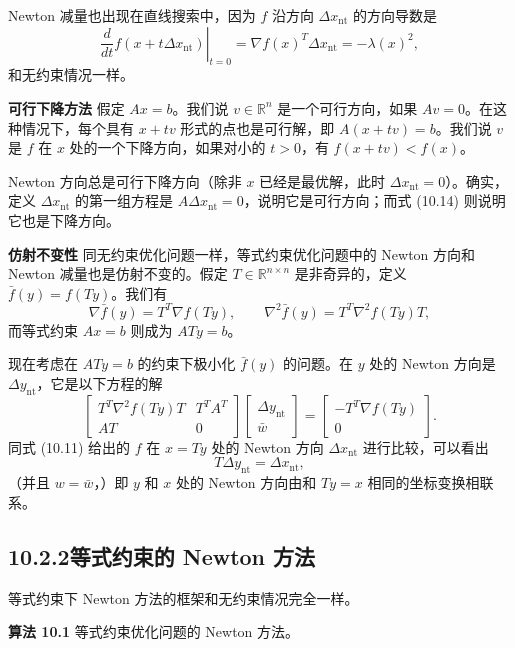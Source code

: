 \documentclass[UTF8, 12pt, fontset=fandol, oneside]{ctexart}
\begin{document}
Newton 减量也出现在直线搜索中，因为 $f$ 沿方向 $\Delta x_{\mathrm{nt}}$ 的方向导数是
\begin{equation}
\left.\frac{d}{dt}f(x+t\Delta x_{\mathrm{nt}})\right|_{t=0}
=\nabla f(x)^T\Delta x_{\mathrm{nt}}=-\lambda(x)^2,
\tag{10.14}
\end{equation}
和无约束情况一样。

\noindent\textbf{可行下降方法}\quad
假定 $Ax=b$。我们说 $v\in\mathbb{R}^n$ 是一个可行方向，如果 $Av=0$。在这种情况下，每个具有 $x+tv$ 形式的点也是可行解，即 $A(x+tv)=b$。我们说 $v$ 是 $f$ 在 $x$ 处的一个下降方向，如果对小的 $t>0$，有 $f(x+tv)<f(x)$。

Newton 方向总是可行下降方向（除非 $x$ 已经是最优解，此时 $\Delta x_{\mathrm{nt}}=0$）。确实，定义 $\Delta x_{\mathrm{nt}}$ 的第一组方程是 $A\Delta x_{\mathrm{nt}}=0$，说明它是可行方向；而式 (10.14) 则说明它也是下降方向。

\noindent\textbf{仿射不变性}\quad
同无约束优化问题一样，等式约束优化问题中的 Newton 方向和 Newton 减量也是仿射不变的。假定 $T\in\mathbb{R}^{n\times n}$ 是非奇异的，定义 $\bar{f}(y)=f(Ty)$。我们有
\[
\nabla \bar{f}(y)=T^T\nabla f(Ty),\qquad
\nabla^2\bar{f}(y)=T^T\nabla^2 f(Ty)T,
\]
而等式约束 $Ax=b$ 则成为 $ATy=b$。

现在考虑在 $ATy=b$ 的约束下极小化 $\bar{f}(y)$ 的问题。在 $y$ 处的 Newton 方向是 $\Delta y_{\mathrm{nt}}$，它是以下方程的解
\[
\begin{bmatrix}
T^T\nabla^2 f(Ty)T & T^TA^T\\
AT & 0
\end{bmatrix}
\begin{bmatrix}
\Delta y_{\mathrm{nt}}\\
\bar{w}
\end{bmatrix}
=
\begin{bmatrix}
-T^T\nabla f(Ty)\\
0
\end{bmatrix}.
\]
同式 (10.11) 给出的 $f$ 在 $x=Ty$ 处的 Newton 方向 $\Delta x_{\mathrm{nt}}$ 进行比较，可以看出
\[
T\Delta y_{\mathrm{nt}}=\Delta x_{\mathrm{nt}},
\]
（并且 $w=\bar{w}$，）即 $y$ 和 $x$ 处的 Newton 方向由和 $Ty=x$ 相同的坐标变换相联系。

\subsection*{10.2.2\quad 等式约束的 Newton 方法}

等式约束下 Newton 方法的框架和无约束情况完全一样。

\noindent\textbf{算法 10.1}\quad
等式约束优化问题的 Newton 方法。
\end{document}
